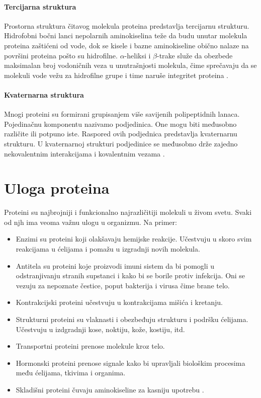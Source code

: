 \paragraph{Tercijarna struktura} 
Prostorna struktura čitavog molekula proteina predstavlja tercijarnu strukturu. Hidrofobni bočni lanci nepolarnih aminokiselina teže da budu unutar molekula proteina zaštićeni od vode, dok se kisele i bazne aminokiseline obično nalaze na površini proteina pošto su hidrofilne. $\alpha$-heliksi i $\beta$-trake služe da obezbede maksimalan broj vodoničnih veza u unutrašnjosti molekula, čime sprečavaju da se molekuli vode vežu za hidrofilne grupe i time naruše integritet proteina \cite{biochemestry5, biohUdz}.


\paragraph{Kvaternarna struktura} Mnogi proteini su formirani grupisanjem više savijenih polipeptidnih lanaca. Pojedinačnu komponentu nazivamo podjedinica. One mogu biti međusobno različite ili potpuno iste. Raspored ovih podjednica predstavlja kvaternarnu strukturu.  U kvaternarnoj strukturi podjedinice se međusobno drže zajedno nekovalentnim interakcijama i kovalentnim vezama \cite{doktJK, biochemestry5, PSF}.


\section{Uloga proteina}


Proteini su najbrojniji i funkcionalno najrazličitiji molekuli u živom svetu. Svaki od njh ima veoma važnu ulogu u organizmu. Na primer:

\begin{itemize}
	\item Enzimi su proteini koji olakšavaju hemijske reakcije. Učestvuju u skoro svim reakcijama u ćelijama i pomažu u izgradnji novih molekula.
	
	\item Antitela su proteini koje proizvodi imuni sistem da bi pomogli u odstranjivanju stranih supstanci i kako bi se borile protiv infekcija. Oni se vezuju za nepoznate čestice, poput bakterija i virusa čime brane telo. 
	
	\item Kontrakcijski proteini učestvuju u kontrakcijama mišića i kretanju.
	
	\item Strukturni proteini su vlaknasti i obezbeđuju strukturu i podršku ćelijama. Učestvuju u izdgradnji kose, noktiju, kože, kostiju, itd.
	
	\item Transportni proteini prenose molekule kroz telo.
	
	\item Hormonski proteini prenose signale kako bi upravljali biološkim procesima među ćelijama, tkivima i organima.
	
	\item Skladišni proteini čuvaju aminokiseline za kasniju upotrebu \cite{fspOnl, roleOnl, nlmOnl}.
	
\end{itemize}
 
 

